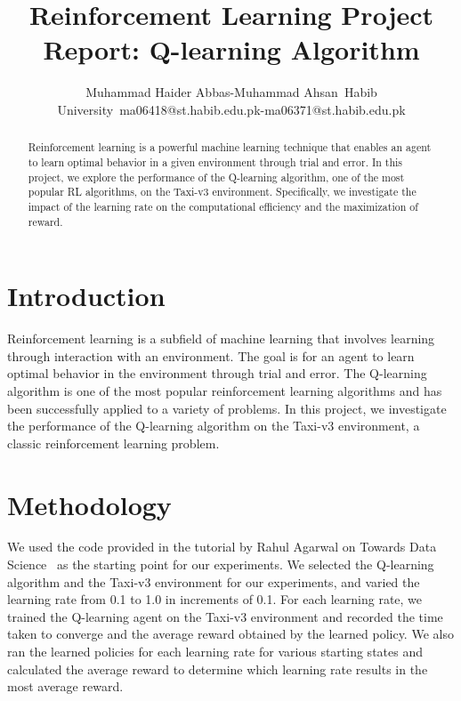 \documentclass{IEEEtran}
\begin{document}
\title{Reinforcement Learning Project Report: Q-learning Algorithm}

\author{Muhammad Haider Abbas-Muhammad Ahsan\
Habib University\
ma06418@st.habib.edu.pk-ma06371@st.habib.edu.pk}

\maketitle

\begin{abstract}
Reinforcement learning is a powerful machine learning technique that enables an agent to learn optimal behavior in a given environment through trial and error. In this project, we explore the performance of the Q-learning algorithm, one of the most popular RL algorithms, on the Taxi-v3 environment. Specifically, we investigate the impact of the learning rate on the computational efficiency and the maximization of reward.
\end{abstract}

\section{Introduction}
Reinforcement learning is a subfield of machine learning that involves learning through interaction with an environment. The goal is for an agent to learn optimal behavior in the environment through trial and error. The Q-learning algorithm is one of the most popular reinforcement learning algorithms and has been successfully applied to a variety of problems. In this project, we investigate the performance of the Q-learning algorithm on the Taxi-v3 environment, a classic reinforcement learning problem.

\section{Methodology}
We used the code provided in the tutorial by Rahul Agarwal on Towards Data Science~\cite{agarwal2020} as the starting point for our experiments. We selected the Q-learning algorithm and the Taxi-v3 environment for our experiments, and varied the learning rate from 0.1 to 1.0 in increments of 0.1. For each learning rate, we trained the Q-learning agent on the Taxi-v3 environment and recorded the time taken to converge and the average reward obtained by the learned policy. We also ran the learned policies for each learning rate for various starting states and calculated the average reward to determine which learning rate results in the most average reward.
\end{document}
